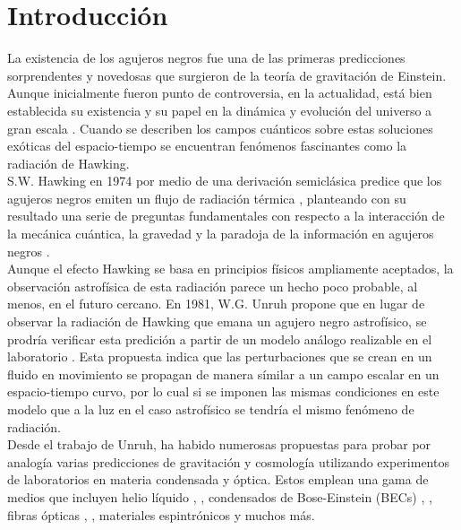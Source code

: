 \chapter{Introducci\'{o}n}\label{cap1}
La existencia de los agujeros negros fue una de las primeras predicciones sorprendentes y novedosas que surgieron de la teoría de gravitaci\'{o}n de Einstein. Aunque inicialmente fueron punto de controversia, en la actualidad, está bien establecida su existencia y su papel en la dinámica y evoluci\'{o}n del universo a gran escala \cite{bambi2018astrophysical}. Cuando se describen los campos cu\'{a}nticos sobre estas soluciones exóticas del espacio-tiempo se encuentran fen\'{o}menos fascinantes como la radiaci\'{o}n de Hawking.\\

S.W. Hawking en 1974  por medio de una derivaci\'{o}n semicl\'{a}sica predice que los agujeros negros emiten un flujo de radiaci\'{o}n t\'{e}rmica \citep{Hawking1974}, planteando con su resultado una serie de preguntas fundamentales con respecto a la interacción de la mecánica cuántica, la gravedad y la paradoja de la información en agujeros negros \citep{susskind2006paradox}.\\

Aunque el efecto Hawking se basa en principios físicos ampliamente aceptados, la observación astrofísica de esta radiación parece un hecho poco probable, al menos, en el futuro cercano. En 1981, W.G. Unruh propone que en lugar de observar la radiación de Hawking que emana un agujero negro astrofísico, se prodr\'{i}a verificar esta predici\'{o}n a partir de un modelo an\'{a}logo realizable en el laboratorio \citep{Unruh1981}. Esta propuesta indica que las perturbaciones que se crean  en un fluido en movimiento se propagan de manera s\'{i}milar a un campo escalar en un espacio-tiempo curvo, por lo cual si se imponen las mismas condiciones en este modelo que a la luz en el caso astrof\'{i}sico se tendr\'{i}a el mismo fen\'{o}meno de radiaci\'{o}n.\\

Desde el trabajo de Unruh, ha habido numerosas propuestas para probar por analogía varias predicciones de gravitaci\'{o}n y cosmología utilizando experimentos de laboratorios en materia condensada y \'{o}ptica. Estos emplean una gama de medios que incluyen helio líquido \citep{volovik2003universe}, \citep{jacobson1998event}, condensados de Bose-Einstein (BECs) \citep{zapata2011resonant}, \citep{2018Bermudez}, fibras \'{o}pticas \citep{philbin2008fiber}, \citep{drori2019observation}, materiales espintrónicos \citep{jannes2011hawking} y muchos m\'{a}s.\\


